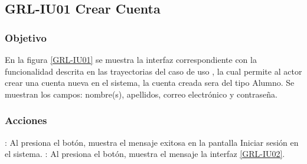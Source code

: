 \clearpage
\subsection{GRL-IU01 Crear Cuenta}

\subsubsection{Objetivo}
En la figura \ref{GRL-IU01} se muestra la interfaz correspondiente con la funcionalidad descrita en las
trayectorias del caso de uso  , la cual permite al actor crear una cuenta nueva en el sistema, 
la cuenta creada sera del tipo Alumno.
Se muestran los campos: nombre(s), apellidos, correo electrónico y contraseña.

\subsubsection{Acciones}


\Titem {} : Al presiona el botón, muestra el mensaje  exitosa en la
pantalla Iniciar sesión en el sistema.
\Titem {} : Al presiona el botón, muestra el mensaje la interfaz \ref{GRL-IU02}.



\clearpage
